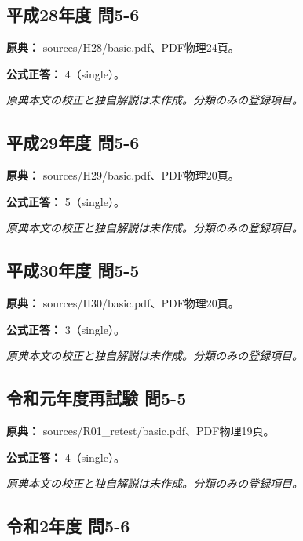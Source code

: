 \subsection{平成28年度 問5-6}
\label{q:h28-reg-basic-5-6}

\noindent\textbf{原典：} sources/H28/basic.pdf、PDF物理24頁。

\textbf{公式正答：} 4（single）。

\par\textit{原典本文の校正と独自解説は未作成。分類のみの登録項目。}

\subsection{平成29年度 問5-6}
\label{q:h29-reg-basic-5-6}

\noindent\textbf{原典：} sources/H29/basic.pdf、PDF物理20頁。

\textbf{公式正答：} 5（single）。

\par\textit{原典本文の校正と独自解説は未作成。分類のみの登録項目。}

\subsection{平成30年度 問5-5}
\label{q:h30-reg-basic-5-5}

\noindent\textbf{原典：} sources/H30/basic.pdf、PDF物理20頁。

\textbf{公式正答：} 3（single）。

\par\textit{原典本文の校正と独自解説は未作成。分類のみの登録項目。}

\subsection{令和元年度再試験 問5-5}
\label{q:r01-ret-basic-5-5}

\noindent\textbf{原典：} sources/R01\_retest/basic.pdf、PDF物理19頁。

\textbf{公式正答：} 4（single）。

\par\textit{原典本文の校正と独自解説は未作成。分類のみの登録項目。}

\subsection{令和2年度 問5-6}
\label{q:r02-reg-basic-5-6}


